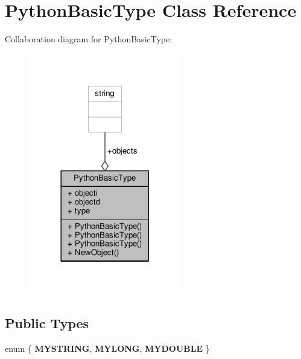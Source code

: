 \hypertarget{classPythonBasicType}{}\section{Python\+Basic\+Type Class Reference}
\label{classPythonBasicType}


Collaboration diagram for Python\+Basic\+Type\+:
\nopagebreak
\begin{figure}[H]
\begin{center}
\leavevmode
\includegraphics[width=189pt]{d9/da9/classPythonBasicType__coll__graph}
\end{center}
\end{figure}
\subsection*{Public Types}
\begin{DoxyCompactItemize}
\item 
enum \{ {\bfseries M\+Y\+S\+T\+R\+I\+NG}, 
{\bfseries M\+Y\+L\+O\+NG}, 
{\bfseries M\+Y\+D\+O\+U\+B\+LE}
 \}\hypertarget{classPythonBasicType_a6bb15530809d9544bf1810835b3ba531}{}\label{classPythonBasicType_a6bb15530809d9544bf1810835b3ba531}

\end{DoxyCompactItemize}
